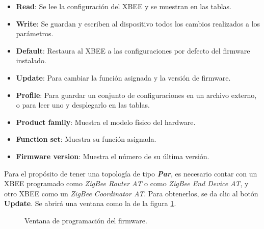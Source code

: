 \begin{itemize}
	\item \textbf{Read}: Se lee la configuración del XBEE y se muestran en las tablas. 
	\item \textbf{Write}: Se guardan y escriben al dispositivo todos los cambios realizados a los parámetros.
	\item \textbf{Default}: Restaura al XBEE a las configuraciones por defecto del firmware instalado.
	\item \textbf{Update}: Para cambiar la función asignada y la versión de firmware.
	\item \textbf{Profile}: Para guardar un conjunto de configuraciones en un archivo externo, o para leer uno y desplegarlo en las tablas.
	\item \textbf{Product family}: Muestra el modelo físico del hardware.
	\item \textbf{Function set}: Muestra su función asignada.
	\item \textbf{Firmware version}: Muestra el número de su última versión.
\end{itemize}

Para el propósito de tener una topología de tipo \textit{\textbf{Par}}, es necesario contar con un XBEE programado como \textit{ZigBee Router AT} o como \textit{ZigBee End Device AT}, y otro XBEE como un \textit{ZigBee Coordinator AT}. Para obtenerlos, se da clic al botón \textbf{Update}. Se abrirá una ventana como la de la figura \ref{fig:Upd}.

\begin{figure}[H] %
\caption{Ventana de programación del firmware.}
\label{fig:Upd}
\end{figure}

